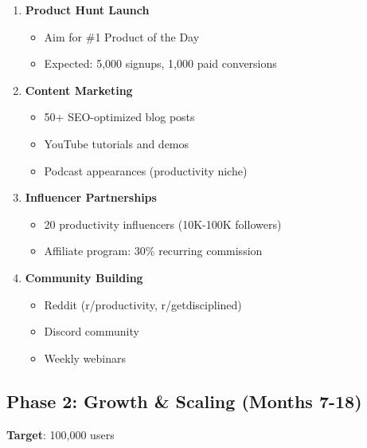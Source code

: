 \begin{enumerate}
    \item \textbf{Product Hunt Launch}
    \begin{itemize}
        \item Aim for \#1 Product of the Day
        \item Expected: 5,000 signups, 1,000 paid conversions
    \end{itemize}
    
    \item \textbf{Content Marketing}
    \begin{itemize}
        \item 50+ SEO-optimized blog posts
        \item YouTube tutorials and demos
        \item Podcast appearances (productivity niche)
    \end{itemize}
    
    \item \textbf{Influencer Partnerships}
    \begin{itemize}
        \item 20 productivity influencers (10K-100K followers)
        \item Affiliate program: 30\% recurring commission
    \end{itemize}
    
    \item \textbf{Community Building}
    \begin{itemize}
        \item Reddit (r/productivity, r/getdisciplined)
        \item Discord community
        \item Weekly webinars
    \end{itemize}
\end{enumerate}

\subsection{Phase 2: Growth \& Scaling (Months 7-18)}

\textbf{Target}: 100,000 users

